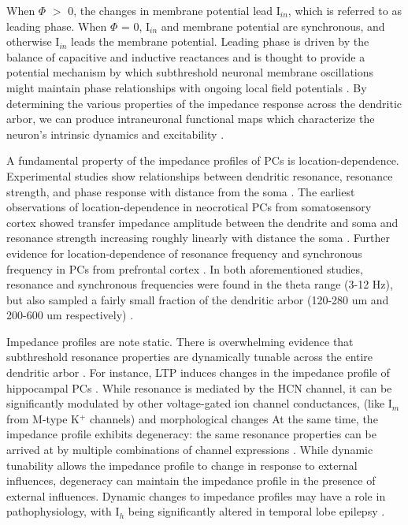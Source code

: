 \documentclass[utf8]{frontiersSCNS} %
\begin{document}
When $\Phi$ $>$ 0, the changes in membrane potential lead  I$_{in}$, which is referred to as leading phase.
When $\Phi$ = 0, I$_{in}$ and membrane potential are synchronous, and otherwise I$_{in}$ leads the membrane potential.
Leading phase is driven by the balance of capacitive and inductive reactances and is thought to provide a potential 
mechanism by which subthreshold neuronal membrane oscillations might maintain phase relationships with ongoing
local field potentials
\citep{Mauro1961-ys, Sabah1969-at, Mauro1970-km, Hu2002-ga, Hu2009-qb, Ulrich2002-dd, Cook2007-cz, Narayanan2008-zw, Vaidya2013-sx, Das2017-nz}.  By determining the various properties of the impedance response 
across the dendritic arbor, we can produce intraneuronal functional maps which characterize the neuron's intrinsic
dynamics and excitability \citep{Narayanan2012-hn}.

A fundamental property of the impedance profiles of PCs is location-dependence. Experimental
studies show relationships between dendritic resonance, resonance strength, and 
phase response with distance from the soma \citep{Das2017-nz, Narayanan2007-gw, Ulrich2002-dd, Dembrow2015-zb}.
The earliest observations of location-dependence in neocrotical PCs from somatosensory cortex 
showed transfer impedance amplitude between the dendrite and soma and resonance strength 
increasing roughly linearly with distance the soma \citep{Ulrich2002-dd}. Further evidence for 
location-dependence of resonance frequency and synchronous frequency in PCs from prefrontal cortex \citep{Dembrow2015-zb}.
In both aforementioned studies, resonance and synchronous frequencies were found in the theta 
range (3-12 Hz), but also sampled a fairly small fraction of the dendritic arbor (120-280 um and 
200-600 um respectively) \citep{Ulrich2002-dd, Dembrow2015-zb}.

Impedance profiles are note static.  There is overwhelming evidence that subthreshold resonance
properties are dynamically tunable across the entire dendritic arbor \citep{Magee2005-oq, Narayanan2007-gw, Narayanan2008-zw, Sjostrom2008-sz, Hu2009-qb, Rathour2012-am, Rathour2012-bu, Das2017-nz}.
For instance, LTP induces changes in the impedance profile of hippocampal PCs \citep{Narayanan2007-gw}.
While resonance is mediated by the HCN channel, it can be significantly modulated by other voltage-gated ion channel conductances, (like I$_m$ from M-type K$^+$ channels)
and morphological changes \citep{Hutcheon2000-gs, Hu2002-ga, Narayanan2008-zw, Zemankovics2010-zt, Rathour2012-bu, Dhupia2014-ad, Rathour2016-vv}
At the same time, the impedance profile exhibits degeneracy: the same resonance properties can be arrived at by
multiple combinations of channel expressions \citep{Rathour2012-bu, Rathour2014-pl, Das2017-nz}. While dynamic 
tunability allows the impedance profile to change in response to external influences, degeneracy can maintain the 
impedance profile in the presence of external influences.  Dynamic changes to impedance profiles may have a role in
pathophysiology, with I$_h$ being significantly altered in temporal lobe epilepsy \citep{Shin2008-za, Marcelin2009-vy}.
\end{document}
